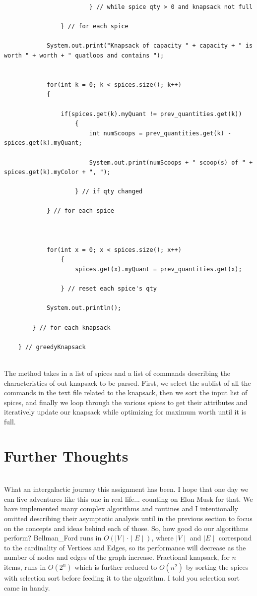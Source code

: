 \documentclass[letterpaper, 10pt]{article}
\begin{document}
\begin{lstlisting}
		                } // while spice qty > 0 and knapsack not full
	                
	            } // for each spice
            
            System.out.print("Knapsack of capacity " + capacity + " is worth " + worth + " quatloos and contains ");


            for(int k = 0; k < spices.size(); k++)
            {

                if(spices.get(k).myQuant != prev_quantities.get(k))
	                {
                		int numScoops = prev_quantities.get(k) - spices.get(k).myQuant;

	                    System.out.print(numScoops + " scoop(s) of " + spices.get(k).myColor + ", ");
	                    
	                } // if qty changed
                
            } // for each spice



            for(int x = 0; x < spices.size(); x++)
	            {
	                spices.get(x).myQuant = prev_quantities.get(x);
	                
	            } // reset each spice's qty
            
            System.out.println();
            
        } // for each knapsack

    } // greedyKnapsack
\end{lstlisting}
\\
The method takes in a list of spices and a list of commands describing the characteristics of out knapsack to be parsed. First, we select the sublist of all the commands in the text file related to the knapsack, then we sort the input list of spices, and finally we loop through the various spices to get their attributes and iteratively update our knapsack while optimizing for maximum worth until it is full.
\\
\section{Further Thoughts}
\\
What an intergalactic journey this assignment has been. I hope that one day we can live adventures like this one in real life... counting on Elon Musk for that. We have implemented many complex algorithms and routines and I intentionally omitted describing their asymptotic analysis until in the previous section to focus on the concepts and ideas behind each of those. So, how good do our algorithms perform? Bellman\_Ford runs in $O(\mid V \mid \cdot \mid E \mid)$, where $\mid V \mid$ and $\mid E \mid$ correspond to the cardinality of Vertices and Edges, so its performance will decrease as the number of nodes and edges of the graph increase. Fractional knapsack, for $n$ items, runs in $O(2^n)$ which is further reduced to $O(n^2)$ by sorting the spices with selection sort before feeding it to the algorithm. I told you selection sort came in handy. 
\end{document}
